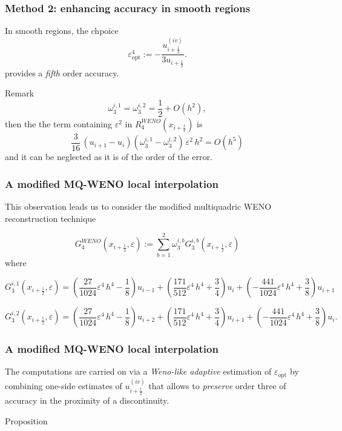 \documentclass[xcolor=dvipsnames,9pt,mathserif]{beamer}
\newcommand\xunmezzo{x_{i+\frac12}}
\newcommand\uunmezzo{u_{i+\frac12}}
\newcommand\eps{{\varepsilon}}
\newcommand{\coll}[1]{\emph{\color{red} #1}}
\begin{document}
     \begin{frame}
     \frametitle{Method 2: enhancing accuracy in smooth regions}
 In smooth regions, the chpoice
\[ \varepsilon_{\text{opt}}^4 := -\frac{u^{(iv)}_{i+\frac12}}{3u_{i+\frac12}}.
\]
provides a \coll{fifth} order accuracy.
\begin{block}{Remark}
$$\omega^{i,1}_3=\omega^{i,2}_3=\frac12 +
O(h^2),$$ then the
the term containing $\varepsilon^2 $ in $R^{WENO}_{4}(x_{i+\frac12})$ is
$$
\frac{3}{16}\,(u_{i+1}-u_i)(\omega_3^{i,1} -
\omega_3^{i,2})\,{\eps}^2\,h^2=O(h^5)
$$
and it can be neglected as it is of the order of the error. \end{block}
 \end{frame}

\begin{frame}
\frametitle{A modified MQ-WENO local interpolation}

This observation leads us
to consider the modified multiquadric WENO %
reconstruction technique

$$
G_4^{WENO}(\xunmezzo,\varepsilon):=\sum_{b=1}^{2}\omega^{i,b}_3
G_{3}^{i,b} (x_{i+\frac12},\varepsilon)
$$
where

$$
G_{3}^{i,1}(\xunmezzo,\varepsilon)
=\left(
\frac{27}{1024}{\eps}^4\,h^4-\frac{1}{8}
\right)u_{i-1}
+\left(
\frac{171}{512}{\eps}^4\,h^4+\frac{3}{4}
\right)u_{i}
+\left(
-\frac{441}{1024}{\eps}^4\,h^4+\frac{3}{8}
 \right)u_{i+1}
 $$

$$
G_{3}^{i,2} (\xunmezzo,\varepsilon)
=\left(
\frac{27}{1024}{\eps}^4\,h^4-\frac{1}{8}
\right)u_{i+2}
+\left(
\frac{171}{512}{\eps}^4\,h^4+\frac{3}{4}
\right)u_{i+1}
+\left(
-\frac{441}{1024}{\eps}^4\,h^4+\frac{3}{8}
 \right)u_{i}.
$$
\end{frame}
\begin{frame}
\frametitle{A modified MQ-WENO local interpolation}

The computations are carried on  via  a \coll{Weno-like adaptive} estimation of $\varepsilon_{\text{opt}}$ by combining one-side estimates of ${u^{(iv)}_{i+\frac12}}$ that  allows to \coll{preserve}  order three of accuracy in the proximity of a discontinuity.

\begin{block}{Proposition}
\end{block}
\end{frame}
\end{document}
